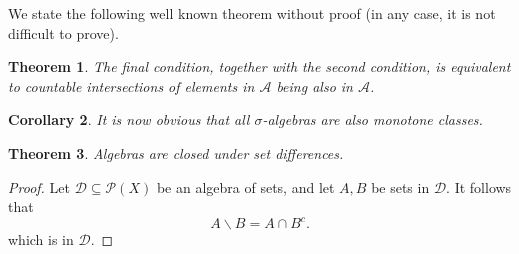 \documentclass[prb,12pt]{revtex4-2}
\newtheorem{Theorem}{Theorem}
\newtheorem{Corollary}[Theorem]{Corollary}
\theoremstyle{definition}
\theoremstyle{definition}
\begin{document}
We state the following well known theorem without proof (in any case, it is not difficult to prove).
\begin{Theorem}
The final condition, together with the second condition, is equivalent to countable intersections of elements in $\mathcal{A}$ being also in $\mathcal{A}$.	
\end{Theorem}
\begin{Corollary}
	It is now obvious that all $\sigma$-algebras are also monotone classes.
\end{Corollary}
\begin{Theorem}
	Algebras are closed under set differences.
\end{Theorem}
\begin{proof}
	Let $\mathcal{D}\subseteq \mathcal{P}(X)$ be an algebra of sets, and let $A,B$ be sets in $\mathcal{D}$. It follows that
	\[
	A\backslash B = A\cap B^c
	.\]
	which is in $\mathcal{D}$.
\end{proof}
\end{document}
